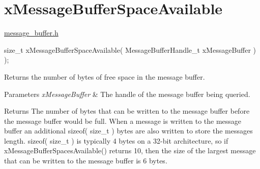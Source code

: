 \hypertarget{group__x_message_buffer_space_available}{}\section{x\+Message\+Buffer\+Space\+Available}
\label{group__x_message_buffer_space_available}
\mbox{\hyperlink{message__buffer_8h_source}{message\+\_\+buffer.\+h}} 
\begin{DoxyPre}
size\_t xMessageBufferSpaceAvailable( MessageBufferHandle\_t xMessageBuffer ) );
\end{DoxyPre}
 Returns the number of bytes of free space in the message buffer.


\begin{DoxyParams}{Parameters}
{\em x\+Message\+Buffer} & The handle of the message buffer being queried.\\
\hline
\end{DoxyParams}
\begin{DoxyReturn}{Returns}
The number of bytes that can be written to the message buffer before the message buffer would be full. When a message is written to the message buffer an additional sizeof( size\+\_\+t ) bytes are also written to store the message\textquotesingle{}s length. sizeof( size\+\_\+t ) is typically 4 bytes on a 32-\/bit architecture, so if x\+Message\+Buffer\+Spaces\+Available() returns 10, then the size of the largest message that can be written to the message buffer is 6 bytes. 
\end{DoxyReturn}
